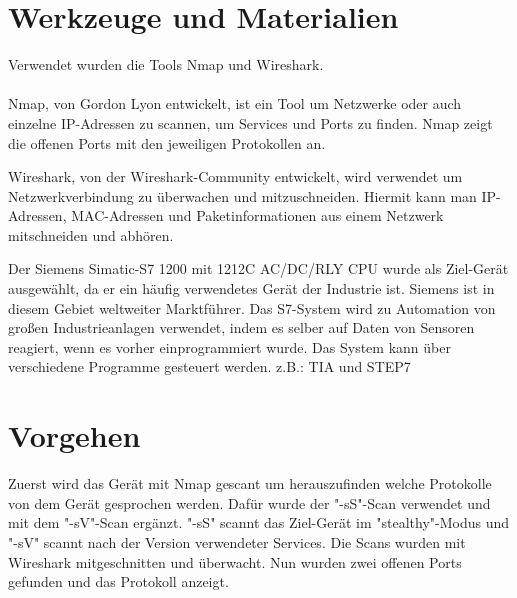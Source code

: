 \section{Werkzeuge und Materialien}

Verwendet wurden die Tools Nmap und Wireshark.\\
\\
 Nmap, von Gordon Lyon entwickelt, ist ein Tool um Netzwerke oder auch einzelne IP-Adressen zu scannen, um Services und Ports zu finden. 
Nmap zeigt die offenen Ports mit den jeweiligen Protokollen an.
	  
 Wireshark, von der Wireshark-Community entwickelt, wird verwendet um Netzwerkverbindung zu überwachen und mitzuschneiden.
 Hiermit kann man IP-Adressen, MAC-Adressen und Paketinformationen aus einem Netzwerk mitschneiden und abhören.

 Der Siemens Simatic-S7 1200 mit 1212C AC/DC/RLY CPU wurde als Ziel-Gerät ausgewählt, da er ein häufig verwendetes Gerät der Industrie ist. 
Siemens ist in diesem Gebiet weltweiter Marktführer.
Das S7-System wird zu Automation von großen Industrieanlagen verwendet, indem es selber auf Daten von Sensoren reagiert, wenn es vorher einprogrammiert wurde.
Das System kann über verschiedene Programme gesteuert werden. z.B.: TIA und STEP7



\cite{RUB}
\cite{beuth}



\section{Vorgehen}
\label{sec:figs}
Zuerst wird das Gerät mit Nmap gescant um herauszufinden welche Protokolle von dem Gerät gesprochen werden.
Dafür wurde der "-sS"-Scan verwendet und mit dem "-sV"-Scan ergänzt.
"-sS" scannt das Ziel-Gerät im "stealthy"-Modus und "-sV" scannt nach der Version verwendeter Services.
Die Scans wurden mit Wireshark mitgeschnitten und überwacht. Nun wurden zwei offenen Ports gefunden und das Protokoll anzeigt.


